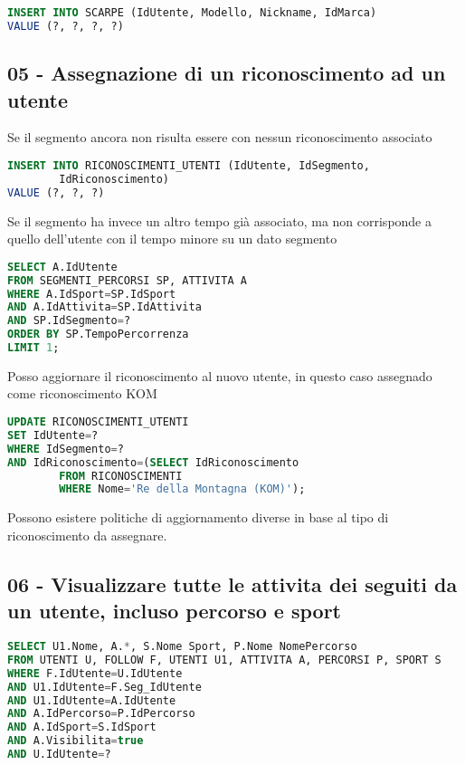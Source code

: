 \documentclass[12pt]{report}
\begin{document}
\begin{lstlisting}[style=sql, language=SQL, label=lst:sql-query]
INSERT INTO SCARPE (IdUtente, Modello, Nickname, IdMarca)
VALUE (?, ?, ?, ?)
\end{lstlisting}


\subsection*{05 - Assegnazione di un riconoscimento ad un utente}
Se il segmento ancora non risulta essere con nessun riconoscimento associato

\begin{lstlisting}[style=sql, language=SQL, label=lst:sql-query]
INSERT INTO RICONOSCIMENTI_UTENTI (IdUtente, IdSegmento, 
        IdRiconoscimento)
VALUE (?, ?, ?)
\end{lstlisting}

Se il segmento ha invece un altro tempo già associato, ma non corrisponde
a quello dell'utente con il tempo minore su un dato segmento
\begin{lstlisting}[style=sql, language=SQL, label=lst:sql-query]
SELECT A.IdUtente
FROM SEGMENTI_PERCORSI SP, ATTIVITA A
WHERE A.IdSport=SP.IdSport
AND A.IdAttivita=SP.IdAttivita
AND SP.IdSegmento=?
ORDER BY SP.TempoPercorrenza
LIMIT 1;
\end{lstlisting}

Posso aggiornare il riconoscimento al nuovo utente, in questo caso 
assegnado come riconoscimento KOM
\begin{lstlisting}[style=sql, language=SQL, label=lst:sql-query]
UPDATE RICONOSCIMENTI_UTENTI
SET IdUtente=?
WHERE IdSegmento=?
AND IdRiconoscimento=(SELECT IdRiconoscimento
        FROM RICONOSCIMENTI
        WHERE Nome='Re della Montagna (KOM)');
\end{lstlisting}

Possono esistere politiche di aggiornamento diverse in base al tipo di riconoscimento da assegnare.

\subsection*{06 - Visualizzare tutte le attivita dei seguiti da un utente, incluso percorso e sport}
\begin{lstlisting}[style=sql, language=SQL, label=lst:sql-query]
SELECT U1.Nome, A.*, S.Nome Sport, P.Nome NomePercorso
FROM UTENTI U, FOLLOW F, UTENTI U1, ATTIVITA A, PERCORSI P, SPORT S
WHERE F.IdUtente=U.IdUtente
AND U1.IdUtente=F.Seg_IdUtente
AND U1.IdUtente=A.IdUtente
AND A.IdPercorso=P.IdPercorso
AND A.IdSport=S.IdSport
AND A.Visibilita=true
AND U.IdUtente=?
\end{lstlisting}
\end{document}
